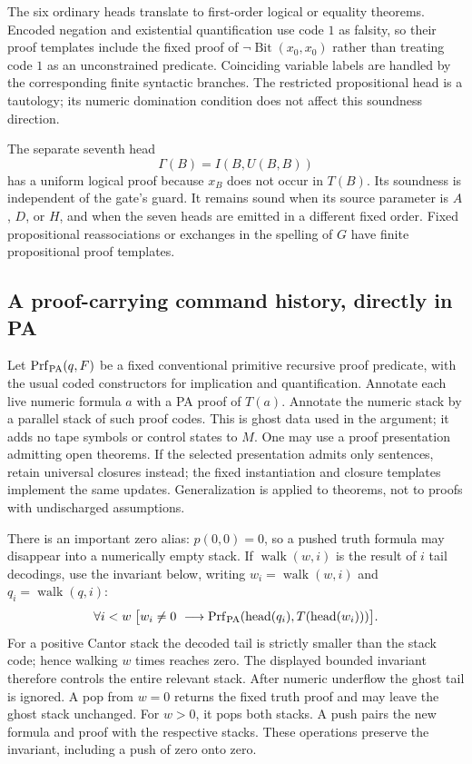 The six ordinary heads translate to first-order logical or equality
theorems.  Encoded negation and existential quantification use code $1$
as falsity, so their proof templates include the fixed proof of
$\neg\operatorname{Bit}(x_0,x_0)$ rather than treating code $1$ as
an unconstrained predicate.  Coinciding variable labels are handled by
the corresponding finite syntactic branches.  The restricted
propositional head is a tautology; its numeric domination condition
does not affect this soundness direction.

The separate seventh head
\[
 \Gamma(B)=I(B,U(B,B))
\]
has a uniform logical proof because $x_B$ does not occur in $T(B)$.
Its soundness is independent of the gate's guard.  It remains sound
when its source parameter is $A$, $D$, or $H$, and when the seven
heads are emitted in a different fixed order.  Fixed propositional
reassociations or exchanges in the spelling of $G$ have finite
propositional proof templates.

\subsection{A proof-carrying command history, directly in PA}

Let $\operatorname{Prf}_{\rm PA}(q,F)$ be a fixed conventional
primitive recursive proof predicate, with the usual coded constructors
for implication and quantification.  Annotate each live numeric formula
$a$ with a PA proof of $T(a)$.  Annotate the numeric stack by a parallel
stack of such proof codes.  This is ghost data used in the argument;
it adds no tape symbols or control states to $M$.
One may use a proof presentation admitting open theorems.  If the selected
presentation admits only sentences, retain universal closures instead;
the fixed instantiation and closure templates implement the same updates.
Generalization is applied to theorems, not to proofs with undischarged
assumptions.

There is an important zero alias: $p(0,0)=0$, so a pushed truth formula
may disappear into a numerically empty stack.  If
$\operatorname{walk}(w,i)$ is the result of $i$ tail decodings, use
the invariant below, writing $w_i=\operatorname{walk}(w,i)$ and
$q_i=\operatorname{walk}(q,i)$:
\[
 \forall i<w\;
 \bigl[w_i\ne0\ \longrightarrow
 \operatorname{Prf}_{\rm PA}
    (\operatorname{head}(q_i),T(\operatorname{head}(w_i)))\bigr].
\]
For a positive Cantor stack the decoded tail is strictly smaller than
the stack code; hence walking $w$ times reaches zero.  The displayed
bounded invariant therefore controls the entire relevant stack.
After numeric underflow the ghost tail is ignored.  A pop from $w=0$
returns the fixed truth proof and may leave the ghost stack unchanged.
For $w>0$, it pops both stacks.  A push pairs the new formula and proof
with the respective stacks.  These operations preserve the invariant,
including a push of zero onto zero.

